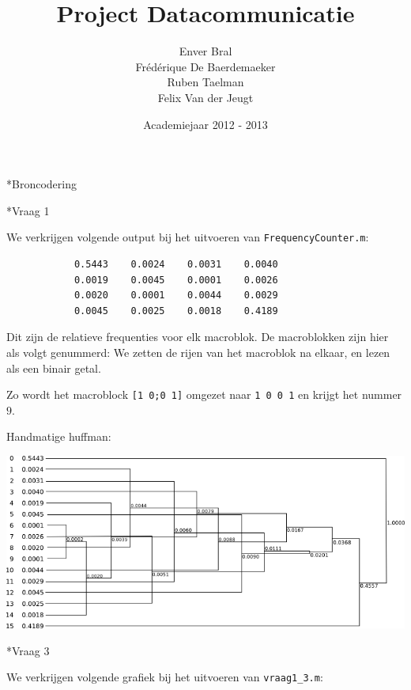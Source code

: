 \documentclass[]{article}
\begin{document}
\title{Project Datacommunicatie}
\author{Enver Bral \\ Fr\'ed\'erique De Baerdemaeker \\ Ruben Taelman \\ Felix Van der Jeugt}
\date{Academiejaar 2012 - 2013}
\maketitle

\begin{section}*{Broncodering}

    \begin{subsection}*{Vraag 1}

        We verkrijgen volgende output bij het uitvoeren van
        \texttt{FrequencyCounter.m}:

        \begin{lstlisting}
            0.5443    0.0024    0.0031    0.0040
            0.0019    0.0045    0.0001    0.0026
            0.0020    0.0001    0.0044    0.0029
            0.0045    0.0025    0.0018    0.4189
        \end{lstlisting}

        Dit zijn de relatieve frequenties voor elk macroblok. De
        macroblokken zijn hier als volgt genummerd: We zetten de rijen
        van het macroblok na elkaar, en lezen als een binair getal.

        Zo wordt het macroblock \texttt{[1 0;0 1]} omgezet naar
        \texttt{1 0 0 1} en krijgt het nummer $9$.

        Handmatige huffman:

        \includegraphics[width=\textwidth]{manual_huffman.png}

    \end{subsection}
    
        \begin{subsection}*{Vraag 3}

        We verkrijgen volgende grafiek bij het uitvoeren van
        \texttt{vraag1\_3.m}:


\end{subsection}
\end{section}
\end{document}
